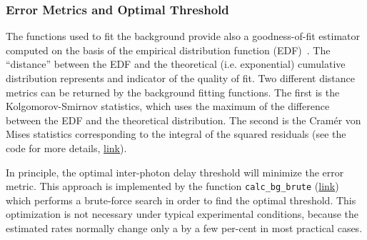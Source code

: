 \subsubsection{Error Metrics and Optimal Threshold}

The functions used to fit the background provide also a goodness-of-fit estimator 
computed on the basis of the empirical distribution function (EDF)~\cite{Stephens1974,Parr1980}. 
The ``distance'' between the EDF and the theoretical (i.e. exponential) cumulative distribution
represents and indicator of the quality of fit.
Two different distance metrics can be returned by the background fitting functions.
The first is the Kolgomorov-Smirnov statistics, which uses the maximum of the difference 
between the EDF and the theoretical distribution. The second is the Cramér von Mises
statistics corresponding to the integral of the squared residuals
(see the code for more details,
\href{https://github.com/tritemio/FRETBursts/blob/master/fretbursts/background.py#L43}{link}).

In principle, the optimal inter-photon delay threshold will minimize
the error metric. This approach is implemented by the function \verb|calc_bg_brute|
(\href{http://fretbursts.readthedocs.org/en/latest/plugins.html#fretbursts.burstlib_ext.calc_bg_brute}{link}) which performs a brute-force search in order to find the optimal threshold.
This optimization is not necessary under typical experimental conditions, 
because the estimated rates normally change only a by a few per-cent 
in most practical cases.
